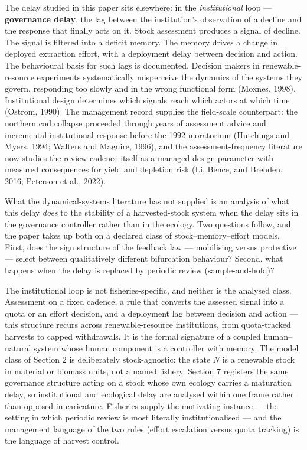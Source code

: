 \documentclass[11pt]{article}
\begin{document}
The delay studied in this paper sits elsewhere: in the
\emph{institutional} loop --- \textbf{governance delay}, the lag between
the institution's observation of a decline and the response that finally
acts on it. Stock assessment produces a signal of decline. The signal is
filtered into a deficit memory. The memory drives a change in deployed
extraction effort, with a deployment delay between decision and action.
The behavioural basis for such lags is documented. Decision makers in
renewable-resource experiments systematically misperceive the dynamics
of the systems they govern, responding too slowly and in the wrong
functional form (Moxnes, 1998). Institutional design determines which
signals reach which actors at which time (Ostrom, 1990). The management
record supplies the field-scale counterpart: the northern cod collapse
proceeded through years of assessment advice and incremental
institutional response before the 1992 moratorium (Hutchings and Myers,
1994; Walters and Maguire, 1996), and the assessment-frequency
literature now studies the review cadence itself as a managed design
parameter with measured consequences for yield and depletion risk (Li,
Bence, and Brenden, 2016; Peterson et al., 2022).

What the dynamical-systems literature has not supplied is an analysis of
what this delay \emph{does} to the stability of a harvested-stock system
when the delay sits in the governance controller rather than in the
ecology. Two questions follow, and the paper takes up both on a declared
class of stock--memory--effort models. First, does the sign structure of
the feedback law --- mobilising versus protective --- select between
qualitatively different bifurcation behaviour? Second, what happens when
the delay is replaced by periodic review (sample-and-hold)?

The institutional loop is not fisheries-specific, and neither is the
analysed class. Assessment on a fixed cadence, a rule that converts the
assessed signal into a quota or an effort decision, and a deployment lag
between decision and action --- this structure recurs across
renewable-resource institutions, from quota-tracked harvests to capped
withdrawals. It is the formal signature of a coupled human--natural
system whose human component is a controller with memory. The model
class of Section 2 is deliberately stock-agnostic: the state \(N\) is a
renewable stock in material or biomass units, not a named fishery.
Section 7 registers the same governance structure acting on a stock
whose own ecology carries a maturation delay, so institutional and
ecological delay are analysed within one frame rather than opposed in
caricature. Fisheries supply the motivating instance --- the setting in
which periodic review is most literally institutionalised --- and the
management language of the two rules (effort escalation versus quota
tracking) is the language of harvest control.
\end{document}
